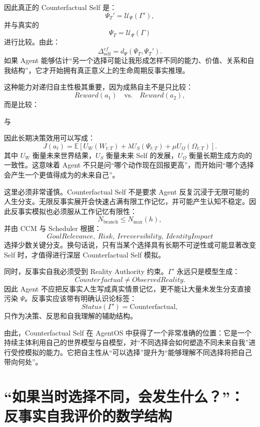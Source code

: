 因此真正的 Counterfactual Self 是：
\[
\Psi_T'
=
\mathcal U_{\Psi}
\left(
\Gamma'
\right),
\]
并与真实的
\[
\Psi_T
=
\mathcal U_{\Psi}
\left(
\Gamma
\right)
\]
进行比较。由此：
\[
\Delta_{\mathrm{self}}^{cf}
=
d_\Psi(\Psi_T,\Psi_T').
\]
如果 Agent 能够估计“另一个选择可能让我形成怎样不同的能力、价值、关系和自我结构”，它才开始拥有真正意义上的生命周期反事实推理。

这种能力对递归自主性极其重要，因为成熟自主不是只比较：
\[
Reward(a_1)
\quad\text{vs.}\quad
Reward(a_2),
\]
而是比较：
\begin{statementbox}
\centering
{}
\end{statementbox}
与
\begin{statementbox}
\centering
{}
\end{statementbox}
因此长期决策效用可以写成：
\[
J(a_t)
=
\mathbb E
\left[
U_W(W_{t:T})
+
\lambda U_S(\Psi_{t:T})
+
\mu U_\Omega(\Omega_{t:T})
\right].
\]
其中 $U_W$ 衡量未来世界结果，$U_S$ 衡量未来 Self 的发展，$U_\Omega$ 衡量长期生成方向的一致性。这意味着 Agent 不只是问“哪个动作现在回报更高”，而开始问“哪个选择会产生一个更值得成为的未来自己”。

这里必须非常谨慎。Counterfactual Self 不是要求 Agent 反复沉浸于无限可能的人生分支。无限反事实展开会快速占满有限工作记忆，并可能产生认知不稳定。因此反事实模拟也必须服从工作记忆有限性：
\[
N_{\mathrm{branch}}
\leq
N_{\max}(h),
\]
并由 CCM 与 Scheduler 根据：
\[
GoalRelevance,\ Risk,\ Irreversibility,\ IdentityImpact
\]
选择少数关键分支。换句话说，只有当某个选择具有长期不可逆性或可能显著改变 Self 时，才值得进行深层 Counterfactual Self 模拟。

同时，反事实自我必须受到 Reality Authority 约束。$\Gamma'$ 永远只是模型生成：
\[
Counterfactual
\neq
ObservedReality.
\]
因此 Agent 不应把反事实人生写成真实情景记忆，更不能让大量未发生分支直接污染 $\Psi$。反事实应该带有明确认识论标签：
\[
Status(\Gamma')=\mathrm{Counterfactual},
\]
只作为决策、反思和自我理解的辅助结构。

由此，Counterfactual Self 在 AgentOS 中获得了一个非常准确的位置：它是一个持续主体利用自己的世界模型与自模型，对“不同选择会如何塑造不同未来自我”进行受控模拟的能力。它把自主性从“可以选择”提升为“能够理解不同选择将把自己带向何处”。

\section{``如果当时选择不同，会发生什么？''：反事实自我评价的数学结构}

